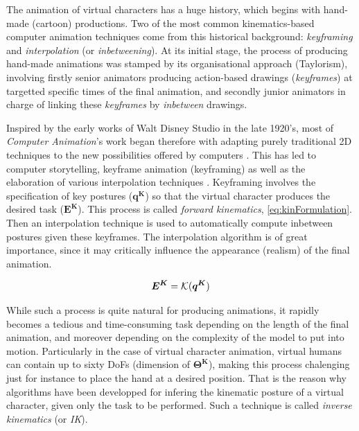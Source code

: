 The animation of virtual characters has a huge history, which begins with hand-made (cartoon) productions. Two of the most common  kinematics-based computer animation techniques come from this historical background: \emph{keyframing} and \emph{interpolation} (or \emph{inbetweening}). At its initial stage, the process of producing hand-made animations was stamped by its organisational approach (Taylorism), involving firstly senior animators producing action-based drawings (\emph{keyframes}) at targetted specific times of the final animation, and secondly junior animators in charge of linking these \emph{keyframes} by \emph{inbetween} drawings.


				\label{subsubsubsec:CA_MC_Kinematics_Fwd}

Inspired by the early works of Walt Disney Studio in the late 1920's, most of \emph{Computer Animation}'s work began therefore with adapting purely traditional 2D techniques to the new possibilities offered by computers . This has led to computer storytelling, keyframe animation (keyframing)  as well as the elaboration of various interpolation techniques . Keyframing involves the specification of key postures ($\boldsymbol{q^K}$) so that the virtual character produces the desired task ($\boldsymbol{E^K}$). This process is called \emph{forward kinematics}, \myequname \eqref{eq:kinFormulation}. Then an interpolation technique is used to automatically compute inbetween postures given these keyframes. The interpolation algorithm is of great importance, since it may critically influence the appearance (realism) of the final animation.

\begin{equation}
	\boldsymbol{E^K} = \mathcal{K}(\boldsymbol{q^K})
\label{eq:kinFormulation}
\eqcaption{Forward kinematics formulation}
\end{equation}

While such a process is quite natural for producing animations, it rapidly becomes a tedious and time-consuming task depending on the length of the final animation, and moreover depending on the complexity of the model to put into motion. Particularly in the case of virtual character animation, virtual humans can contain up to sixty DoFs (dimension of $\boldsymbol{\Theta^K}$), making this process chalenging just for instance to place the hand at a desired position. That is the reason why algorithms have been developped for infering the kinematic posture of a virtual character, given only the task to be performed. Such a technique is called \emph{inverse kinematics} (or \emph{IK}).


